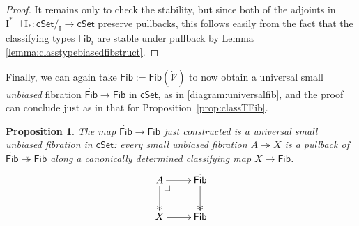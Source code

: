 \documentclass[12pt]{article}
\makeatletter
\newcommand{\FF}{\ensuremath{\mathcal{F}}}
\newcommand{\EE}{\ensuremath{\mathcal{E}}}
\newcommand{\cSet}{\ensuremath{\mathsf{cSet}}}
\newcommand{\ra}{\ensuremath{\rightarrow}}
\newcommand{\fib}{\ensuremath{\twoheadrightarrow}}
\renewcommand{\to}{\ensuremath{\rightarrow}}
\newcommand{\I}{\ensuremath{\mathrm{I}}}
\newcommand{\U}{\ensuremath{\mathcal{U}}}
\newcommand{\UU}{\ensuremath{\,\dot{\mathcal{U}}}}
\newcommand{\VV}{\ensuremath{\dot{\mathcal{V}}}}
\newcommand{\Fib}{\ensuremath{\mathsf{Fib}}}
\newcommand{\FFib}{\ensuremath{\dot{\mathsf{Fib}}}}
\newtheorem{proposition}[theorem]{Proposition}
\theoremstyle{remark}
\theoremstyle{definition}
\newtheorem{definition}[theorem]{Definition}
\newcommand{\pbcorner}[1][dr]{\save*!/#1-1.2pc/#1:(-1,1)@^{|-}\restore}
\makeatother
\begin{document}
\begin{proof} It remains only to check the stability, but since both of the adjoints in $\I^* \dashv \I_* : \cSet/_\I \ra\cSet$ preserve pullbacks, this follows easily from the fact that the classifying types $\Fib_i$ are stable under pullback by Lemma \ref{lemma:classtypebiasedfibstruct}.
\end{proof}

%


Finally, we can again take $\Fib := \Fib(\VV)$ to now obtain a universal small \emph{unbiased} fibration $\FFib\ra\Fib$ in $\cSet$, as in \eqref{diagram:universalfib}, and the proof can conclude just as in that for Proposition~\ref{prop:classTFib}.  

\begin{proposition}\label{prop:UniversalunbiasedFib}
The map $\FFib\ra\Fib$ just constructed is a \emph{universal small unbiased fibration} in $\cSet$: every small unbiased fibration $A \fib X$ is a pullback of $\FFib \fib \Fib$ along a canonically determined classifying map $X\ra \Fib$.
\begin{equation}\label{diagram:classifyfib}
\xymatrix{
A \ar@{>>}[d] \ar[r]  \pbcorner & \FFib \ar@{>>}[d] \\
X \ar[r] & \Fib
}
\end{equation}
\end{proposition}

\end{document}
